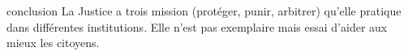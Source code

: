 \documentclass{beamer}
\begin{document}




 \begin{frame}{conclusion}
 La Justice a trois mission (protéger, punir, arbitrer) qu'elle pratique dans différentes institutions. Elle n'est pas exemplaire mais essai d'aider aux mieux les citoyens.
 
 \end{frame}

  
\end{document}
